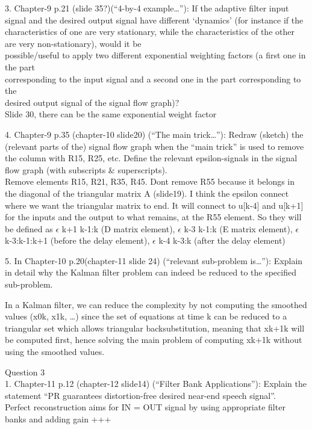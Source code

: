 \documentclass[
  a4paper,
  ,captions=tableheading
]{scrartcl}
\begin{document}
3. Chapter-9 p.21 (slide 35?)(``4-by-4 example\ldots{}''): If the
adaptive filter input signal and the desired output signal have
different `dynamics' (for instance if the characteristics of one are
very stationary, while the characteristics of the other are very
non-stationary), would it be\\
possible/useful to apply two different exponential weighting factors (a
first one in the part\\
corresponding to the input signal and a second one in the part
corresponding to the\\
desired output signal of the signal flow graph)?\\
Slide 30, there can be the same exponential weight factor

4. Chapter-9 p.35 (chapter-10 slide20) (``The main trick\ldots{}''):
Redraw (sketch) the (relevant parts of the) signal flow graph when the
``main trick'' is used to remove the column with R15, R25, etc. Define
the relevant epsilon-signals in the signal flow graph (with subscripts
\& superscripts).\\
Remove elements R15, R21, R35, R45. Dont remove R55 because it belongs
in the diagonal of the triangular matrix A (slide19). I think the
epsilon connect where we want the triangular matrix to end. It will
connect to u{[}k-4{]} and u{[}k+1{]} for the inputs and the output to
what remains, at the R55 element. So they will be defined as
\(\epsilon\) k+1 k-1:k (D matrix element), \(\epsilon\) k-3 k-1:k (E
matrix element), \(\epsilon\) k-3:k-1:k+1 (before the delay element),
\(\epsilon\) k-4 k-3:k (after the delay element)

5. In Chapter-10 p.20(chapter-11 slide 24) (``relevant sub-problem
is\ldots{}''): Explain in detail why the Kalman filter problem can
indeed be reduced to the specified sub-problem.

In a Kalman filter, we can reduce the complexity by not computing the
smoothed values (x0\textbar k, x1\textbar k, \ldots) since the set of
equations at time k can be reduced to a triangular set which allows
triangular backsubstitution, meaning that xk+1\textbar k will be
computed first, hence solving the main problem of computing
xk+1\textbar k without using the smoothed values.

Question 3\\
1. Chapter-11 p.12 (chapter-12 slide14) (``Filter Bank Applications''):
Explain the statement ``PR guarantees distortion-free desired near-end
speech signal''.\\
Perfect reconstruction aims for IN = OUT signal by using appropriate
filter banks and adding gain +++
\end{document}
